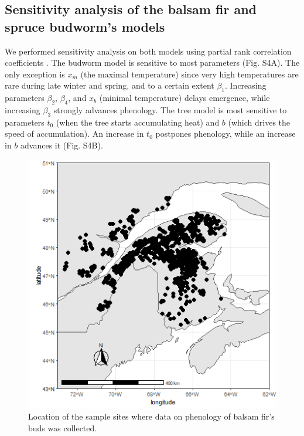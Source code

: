 \documentclass[12 pt]{article}
\begin{document}
\subsection{Sensitivity analysis of the balsam fir and spruce budworm's models}
We performed sensitivity analysis on both models using partial rank correlation coefficients \citep{Wu2013}. The budworm model is sensitive to most parameters (Fig. S4A). The only exception is $x_m$ (the maximal temperature) since very high temperatures are rare during late winter and spring, and to a certain extent $\beta _1$. Increasing parameters $\beta _2$, $\beta _4$, and $x_b$ (minimal temperature) delays emergence, while increasing $\beta _3$ strongly advances phenology. The tree model is most sensitive to parameters $t_0$ (when the tree starts accumulating heat) and $b$ (which drives the speed of accumulation). An increase in $t_0$ postpones phenology, while an increase in $b$ advances it (Fig. S4B).

\begin{figure}[ht]
\begin{center}
\renewcommand{\thefigure}{S\arabic{figure}}
\includegraphics[width = 16 cm, keepaspectratio]{map_fitting}
\caption{\doublespacing Location of the sample sites where data on phenology of balsam fir's buds was collected.}
\end{center}
\end{figure}
\end{document}
